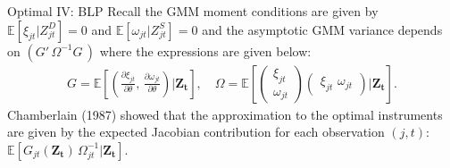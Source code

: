 \begin{frame}{Optimal IV: BLP}
Recall the GMM moment conditions are given by $\mathbb{E}[\xi_{jt} | Z_{jt}^D]=0$ and $\mathbb{E}[\omega_{jt} | Z_{jt}^S]=0$ and the asymptotic GMM variance depends on $(G'\, \Omega^{-1} G\,)$ where the expressions are given below:
\begin{align*}
    G=\mathbb{E}\left[
    \left(\frac{\partial \xi_{jt}}{\partial \theta}, \,
    \frac{\partial \omega_{jt}}{\partial \theta} \right)
| \mathbf{Z_t} \right], \quad 
\Omega = \mathbb{E}\left[
\begin{pmatrix}
    \xi_{jt} \\
    \omega_{jt}
\end{pmatrix}
\begin{pmatrix}
    \xi_{jt}\, \,
    \omega_{jt}
\end{pmatrix}
| \mathbf{Z_t} \right].
\end{align*}
Chamberlain (1987) showed that the approximation to the optimal instruments are given by the expected Jacobian contribution for each observation $(j,t)$: $\mathbb{E}[G_{jt}(\mathbf{Z_t})\, \Omega_{jt}^{-1} | \mathbf{Z_t}]$.\\
\end{frame}




